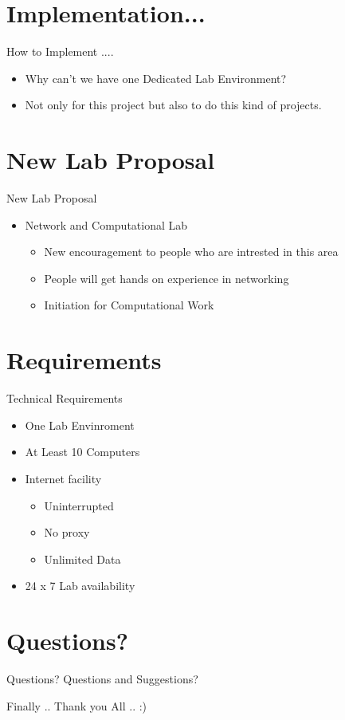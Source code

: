 \documentclass[xcolor=dvipsnames]{beamer}
\begin{document}
\section{Implementation...}
\begin{frame}{How to Implement ....}
\begin{itemize}
	\item Why can't we have one Dedicated Lab Environment?
	\item Not only for this project but also to do this kind of projects.
	
\end{itemize}
\end{frame}

\section{New Lab Proposal }
\begin{frame}{New Lab Proposal }
\begin{itemize}
	\item Network and Computational Lab
		\begin{itemize}
			\item New encouragement to people who are intrested in this area 
			\item People will get hands on experience in networking
			\item Initiation for Computational Work
		\end{itemize}
\end{itemize}
\end{frame}

\section{Requirements}
\begin{frame}{Technical Requirements}
\begin{itemize}
	\item One Lab Envinroment
	\item At Least 10 Computers
	\item Internet facility
		\begin{itemize}
			\item Uninterrupted
			\item No proxy 
			\item Unlimited Data
		\end{itemize}
	\item 24 x 7 Lab availability
\end{itemize}
\end{frame}

\section{Questions?}
\begin{frame}{Questions?}
\centering
Questions and Suggestions? 
\end{frame}


\begin{frame}{Finally ..}
Thank you All .. :)
\end{frame}
\end{document}
